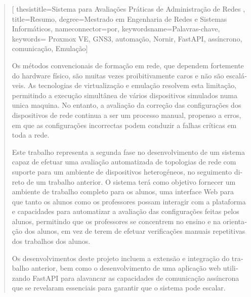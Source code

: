 \begin{abstract}[
	thesistitle={Sistema para Avaliações Práticas de Administração de Redes },
	title={Resumo},
	degree={Mestrado em Engenharia de Redes e Sistemas Informáticos},
	nameconnector={por},
        keywordsname={Palavras-chave},
        keywords={ Proxmox VE, GNS3, automação, Nornir, FastAPI, assíncrono, comunicação, Emulação}]
\begin{otherlanguage}{portuguese}

Os métodos convencionais de formação em rede, que dependem fortemente do hardware físico, são muitas vezes proibitivamente 
caros e não são escaláveis. As tecnologias de virtualização e emulação resolvem esta limitação, permitindo a execução 
simultânea de vários dispositivos simulados numa unica maquina. No entanto, a avaliação da correção das configurações dos 
dispositivos de rede continua a ser um processo manual, propenso a erros, em que as configurações incorrectas podem conduzir 
a falhas críticas em toda a rede.

Este trabalho representa a segunda fase no desenvolvimento de um sistema capaz de efetuar uma avaliação automatizada de topologias 
de rede com suporte para um ambiente de dispositivos heterogéneos, no seguimento direto de um trabalho anterior. O sistema 
terá como objetivo fornecer um ambiente de trabalho completo para os alunos, uma interface Web para que tanto os alunos como 
os professores possam interagir com a plataforma e capacidades para automatizar a avaliação das configurações feitas pelos 
alunos, permitindo que os professores se concentrem no ensino e na orientação dos alunos, em vez de terem de efetuar 
verificações manuais repetitivas dos trabalhos dos alunos.

Os desenvolvimentos deste projeto incluem a extensão e integração do trabalho anterior, bem como o desenvolvimento de uma 
aplicação web utilizando FastAPI para alavancar as capacidades de comunicação assíncrona que se revelaram essenciais para 
garantir que o sistema pode escalar.


\end{otherlanguage}
\end{abstract}
